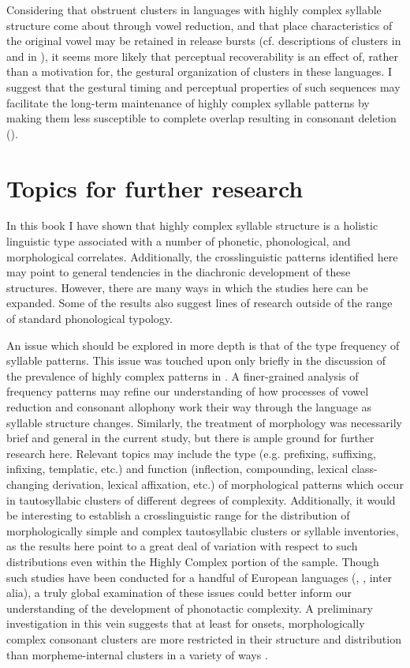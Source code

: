   Considering that obstruent clusters in languages with highly complex syllable structure come about through vowel reduction, and that place characteristics of the original vowel may be retained in release bursts (cf. descriptions of clusters in  and  in ), it seems more likely that perceptual recoverability is an effect of, rather than a motivation for, the gestural organization of clusters in these languages. I suggest that the gestural timing and perceptual properties of such sequences may facilitate the long-term maintenance of highly complex syllable patterns by making them less susceptible to complete overlap resulting in consonant deletion (\citealt{BrowmanGoldstein1990}).

\section{Topics for further research}\label{sec:8.6}

  In this book I have shown that highly complex syllable structure is a holistic linguistic type associated with a number of phonetic, phonological, and morphological correlates. Additionally, the crosslinguistic patterns identified here may point to general tendencies in the diachronic development of these structures. However, there are many ways in which the studies here can be expanded. Some of the results also suggest lines of research outside of the range of standard phonological typology.

  An issue which should be explored in more depth is that of the type frequency of syllable patterns. This issue was touched upon only briefly in the discussion of the prevalence of highly complex patterns in . A finer-grained analysis of frequency patterns may refine our understanding of how processes of vowel reduction and consonant allophony work their way through the language as syllable structure changes. Similarly, the treatment of morphology was necessarily brief and general in the current study, but there is ample ground for further research here. Relevant topics may include the type (e.g. prefixing, suffixing, infixing, templatic, etc.) and function (inflection, compounding, lexical class-changing derivation, lexical affixation, etc.) of morphological patterns which occur in tautosyllabic clusters of different degrees of complexity. Additionally, it would be interesting to establish a crosslinguistic range for the distribution of morphologically simple and complex tautosyllabic clusters or syllable inventories, as the results here point to a great deal of variation with respect to such distributions even within the Highly Complex portion of the sample. Though such studies have been conducted for a handful of European languages (\citealt{DresslerDziubalska-Kołaczyk2006}, \citealt{DresslerEtAl2010}, inter alia), a truly global examination of these issues could better inform our understanding of the development of phonotactic complexity. A preliminary investigation in this vein suggests that at least for onsets, morphologically complex consonant clusters are more restricted in their structure and distribution than morpheme-internal clusters in a variety of ways \citep{Easterday2019}.

